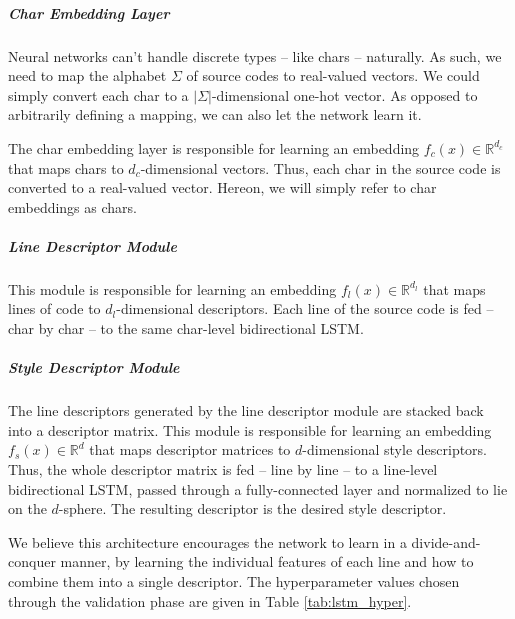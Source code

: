 \subparagraph*{Char Embedding Layer}

Neural networks can't handle discrete types -- like chars -- naturally. As such, we need to map the alphabet $\Sigma$ of source codes to real-valued vectors. We could simply convert each char to a $|\Sigma|$-dimensional one-hot vector. As opposed to arbitrarily defining a mapping, we can also let the network learn it. 

The char embedding layer is responsible for learning an embedding $f_c(x) \in \mathbb{R}^{d_c}$ that maps chars to $d_c$-dimensional vectors. Thus, each char in the source code is converted to a real-valued vector. Hereon, we will simply refer to char embeddings as chars.

\subparagraph*{Line Descriptor Module} 

This module is responsible for learning an embedding $f_l(x) \in \mathbb{R}^{d_l}$ that maps lines of code to $d_l$-dimensional descriptors. Each line of the source code is fed -- char by char -- to the same char-level bidirectional LSTM.

\subparagraph*{Style Descriptor Module}

The line descriptors generated by the line descriptor module are stacked back into a descriptor matrix. This module is responsible for learning an embedding $f_s(x) \in \mathbb{R}^d$ that maps descriptor matrices to $d$-dimensional style descriptors. Thus, the whole descriptor matrix is fed -- line by line -- to a line-level bidirectional LSTM, passed through a fully-connected layer and normalized to lie on the $d$-sphere. The resulting descriptor is the desired style descriptor.

We believe this architecture encourages the network to learn in a divide-and-conquer manner, by learning the individual features of each line and how to combine them into a single descriptor. The hyperparameter values chosen through the validation phase are given in Table \ref{tab:lstm_hyper}.

